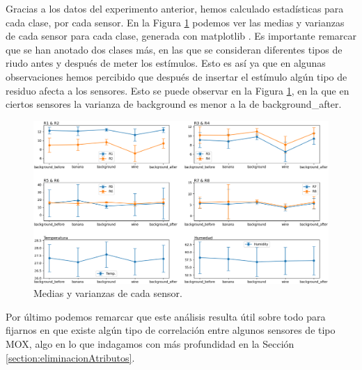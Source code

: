 \documentclass{esannV2}
\begin{document}
\noindent
Gracias a los datos del experimento anterior, hemos calculado estadísticas para cada clase, por cada sensor. En la Figura \ref{fig:mediasSensores} podemos ver las medias y varianzas de cada sensor para cada clase, generada con matplotlib \cite{matplotlib}. Es importante remarcar que se han anotado dos clases más, en las que se consideran diferentes tipos de riudo antes y después de meter los estímulos. Esto es así ya que en algunas observaciones hemos percibido que después de insertar el estímulo algún tipo de residuo afecta a los sensores. Esto se puede observar en la Figura \ref{fig:mediasSensores}, en la que  en ciertos sensores la varianza de background es menor a la de background\_after.\newline
\begin{figure}[H]
    \centering
    \centering
    \includegraphics[width=\linewidth]{figuras/mediasSensores.png}
    \caption{Medias y varianzas de cada sensor.}
    \label{fig:mediasSensores}
\end{figure}
\noindent
Por último podemos remarcar que este análisis resulta útil sobre todo para fijarnos en que existe algún tipo de correlación entre algunos sensores de tipo MOX, algo en lo que indagamos con más profundidad en la Sección \ref{section:eliminacionAtributos}.
\end{document}
